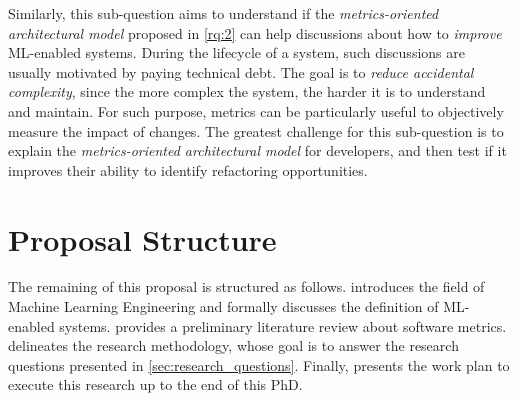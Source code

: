     Similarly, this sub-question aims to understand if the
    \emph{metrics-oriented architectural model} proposed in \cref{rq:2}
    can help discussions about how to \emph{improve} ML-enabled systems.
    During the lifecycle of a system, such discussions are usually motivated
    by paying technical debt. The goal is to \emph{reduce accidental complexity},
    since the more complex the system, the harder it is to understand and
    maintain. For such purpose, metrics can be particularly useful to
    objectively measure the impact of changes. The greatest challenge
    for this sub-question is to explain the \emph{metrics-oriented
    architectural model} for developers, and then test if it improves
    their ability to identify refactoring opportunities.

  \section{Proposal Structure}
  \label{sec:proposal_structure}

    The remaining of this proposal is structured as follows.
       introduces the field of
      Machine Learning Engineering and formally discusses the definition
      of ML-enabled systems.
       provides a preliminary literature
      review about software metrics.
       delineates the research
      methodology, whose goal is to answer the research questions
      presented in \cref{sec:research_questions}.
      Finally,  presents the work plan to execute
      this research up to the end of this PhD.



